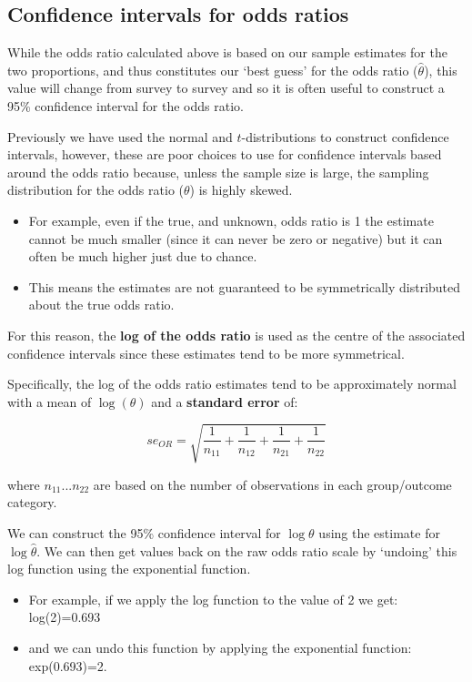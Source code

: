 \documentclass[
  oneside]{krantz}
\begin{document}
\hypertarget{confidence-intervals-for-odds-ratios}{%
\subsection{Confidence intervals for odds ratios}\label{confidence-intervals-for-odds-ratios}}

While the odds ratio calculated above is based on our sample estimates for the two proportions, and thus constitutes our `best guess' for the odds ratio (\(\hat{\theta}\)), this value will change from survey to survey and so it is often useful to construct a 95\% confidence interval for the odds ratio.

Previously we have used the normal and \(t\)-distributions to construct confidence intervals, however, these are poor choices to use for confidence intervals based around the odds ratio because, unless the sample size is large, the sampling distribution for the odds ratio (\(\theta\)) is highly skewed.

\begin{itemize}
\item
  For example, even if the true, and unknown, odds ratio is 1 the estimate cannot be much smaller (since it can never be zero or negative) but it can often be much higher just due to chance.
\item
  This means the estimates are not guaranteed to be symmetrically distributed about the true odds ratio.
\end{itemize}

For this reason, the \textbf{log of the odds ratio} is used as the centre of the associated confidence intervals since these estimates tend to be more symmetrical.

Specifically, the log of the odds ratio estimates tend to be approximately normal with a mean of \(\log(\theta)\) and a \textbf{standard error} of:

\[se_{OR}=\sqrt{\frac{1}{n_{11}}+\frac{1}{n_{12}}+\frac{1}{n_{21}}+\frac{1}{n_{22}}}\]

where \(n_{11}...n_{22}\) are based on the number of observations in each group/outcome category.

We can construct the 95\% confidence interval for \(\log\theta\) using the estimate for \(\log\hat{\theta}\). We can then get values back on the raw odds ratio scale by `undoing' this log function using the exponential function.

\begin{itemize}
\item
  For example, if we apply the log function to the value of 2 we get: log(2)=0.693
\item
  and we can undo this function by applying the exponential function: exp(0.693)=2.
\end{itemize}
\end{document}
